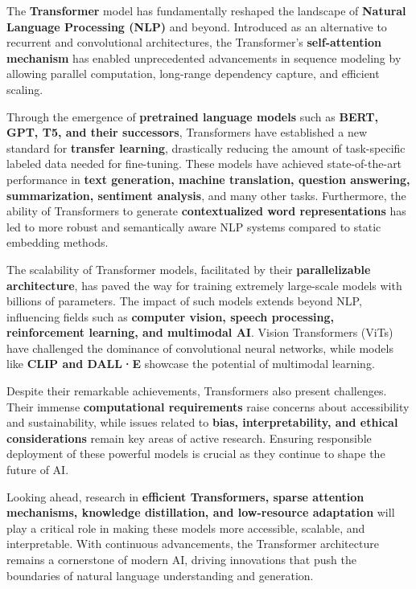 The \textbf{Transformer} model has fundamentally reshaped the landscape of \textbf{Natural Language Processing (NLP)} and beyond. Introduced as an alternative to recurrent and convolutional architectures, the Transformer’s \textbf{self-attention mechanism} has enabled unprecedented advancements in sequence modeling by allowing parallel computation, long-range dependency capture, and efficient scaling.

Through the emergence of \textbf{pretrained language models} such as \textbf{BERT, GPT, T5, and their successors}, Transformers have established a new standard for \textbf{transfer learning}, drastically reducing the amount of task-specific labeled data needed for fine-tuning. These models have achieved state-of-the-art performance in \textbf{text generation, machine translation, question answering, summarization, sentiment analysis}, and many other tasks. Furthermore, the ability of Transformers to generate \textbf{contextualized word representations} has led to more robust and semantically aware NLP systems compared to static embedding methods.

The scalability of Transformer models, facilitated by their \textbf{parallelizable architecture}, has paved the way for training extremely large-scale models with billions of parameters. The impact of such models extends beyond NLP, influencing fields such as \textbf{computer vision, speech processing, reinforcement learning, and multimodal AI}. Vision Transformers (ViTs) have challenged the dominance of convolutional neural networks, while models like \textbf{CLIP and DALL·E} showcase the potential of multimodal learning.

Despite their remarkable achievements, Transformers also present challenges. Their immense \textbf{computational requirements} raise concerns about accessibility and sustainability, while issues related to \textbf{bias, interpretability, and ethical considerations} remain key areas of active research. Ensuring responsible deployment of these powerful models is crucial as they continue to shape the future of AI.

Looking ahead, research in \textbf{efficient Transformers, sparse attention mechanisms, knowledge distillation, and low-resource adaptation} will play a critical role in making these models more accessible, scalable, and interpretable. With continuous advancements, the Transformer architecture remains a cornerstone of modern AI, driving innovations that push the boundaries of natural language understanding and generation.

\newpage 